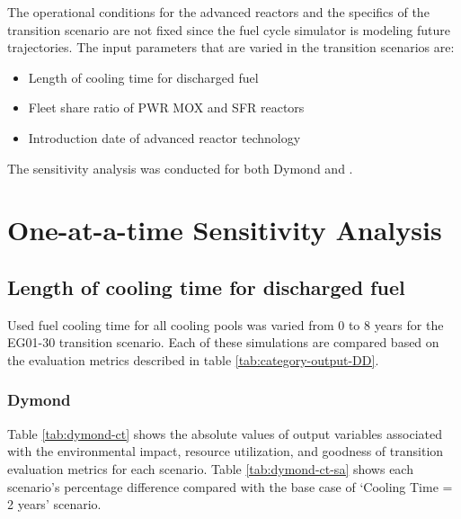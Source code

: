 The operational conditions for the advanced reactors and
the specifics of the transition scenario are not 
fixed since the fuel cycle simulator is modeling future 
trajectories. 
The input parameters that are varied in the
transition scenarios are: 
\begin{itemize}
    \item Length of cooling time for discharged fuel 
    \item Fleet share ratio of PWR MOX and SFR reactors 
	\item Introduction date of advanced reactor technology
\end{itemize}

The sensitivity analysis was conducted for both Dymond and \Cyclus. 

\section{One-at-a-time Sensitivity Analysis}

\subsection{Length of cooling time for discharged fuel}
Used fuel cooling time for all cooling pools was varied from 
0 to 8 years for the EG01-30 transition scenario. 
Each of these simulations are compared based on the evaluation 
metrics described in table \ref{tab:category-output-DD}.

\subsubsection{\textbf{Dymond}}
Table \ref{tab:dymond-ct} shows the absolute values of 
output variables associated with the environmental impact, 
resource utilization, and goodness of transition evaluation 
metrics for each scenario. 
Table \ref{tab:dymond-ct-sa} shows each scenario's percentage 
difference compared with the base case of `Cooling Time = 2 years'
scenario.

